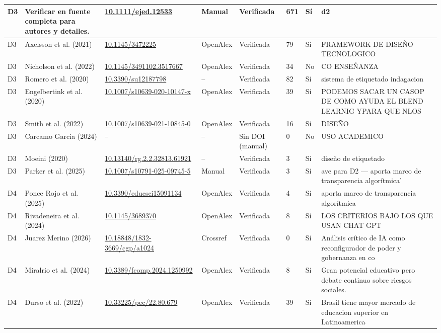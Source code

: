 {\begin{longtable}{|p{0.55cm}|p{2.6cm}|p{2.8cm}|p{1.3cm}|p{1.6cm}|p{0.8cm}|p{0.45cm}|p{2.4cm}|}
\hline
D3 & Verificar en fuente completa para autores y detalles. & {\scriptsize \url{10.1111/ejed.12533}} & Manual & Verificada & 671 & Sí & d2 \\
\hline
D3 & Axelsson et al. (2021) & {\scriptsize \url{10.1145/3472225}} & OpenAlex & Verificada & 79 & Sí & FRAMEWORK DE DISEÑO TECNOLOGICO \\
\hline
D3 & Nicholson et al. (2022) & {\scriptsize \url{10.1145/3491102.3517667}} & OpenAlex & Verificada & 34 & No & CO ENSEÑANZA \\
\hline
D3 & Romero et al. (2020) & {\scriptsize \url{10.3390/su12187798}} & -- & Verificada & 82 & Sí & sistema de etiquetado indagacion \\
\hline
D3 & Engelbertink et al. (2020) & {\scriptsize \url{10.1007/s10639-020-10147-x}} & OpenAlex & Verificada & 39 & Sí & PODEMOS SACAR UN CASOP DE COMO AYUDA  EL BLEND LEARNIG YPARA QUE NLOS  \\
\hline
D3 & Smith et al. (2022) & {\scriptsize \url{10.1007/s10639-021-10845-0}} & OpenAlex & Verificada & 16 & Sí & DISEÑO \\
\hline
D3 & Carcamo Garcia (2024) & {\scriptsize --} & -- & Sin DOI (manual) & 0 & No & USO ACADEMICO \\
\hline
D3 & Moeini (2020) & {\scriptsize \url{10.13140/rg.2.2.32813.61921}} & -- & Verificada & 3 & Sí & diseño de etiquetado \\
\hline
D3 & Parker et al. (2025) & {\scriptsize \url{10.1007/s10791-025-09745-5}} & Manual & Verificada & 3 & Sí & ave para D2 — aporta marco de transparencia algorítmica' \\
\hline
D4 & Ponce Rojo et al. (2025) & {\scriptsize \url{10.3390/educsci15091134}} & OpenAlex & Verificada & 4 & Sí & aporta marco de transparencia algorítmica \\
\hline
D4 & Rivadeneira et al. (2024) & {\scriptsize \url{10.1145/3689370}} & OpenAlex & Verificada & 8 & Sí & LOS CRITERIOS BAJO LOS QUE USAN CHAT GPT \\
\hline
D4 & Juarez Merino (2026) & {\scriptsize \url{10.18848/1832-3669/cgp/a1024}} & Crossref & Verificada & 0 & Sí & Análisis crítico de IA como reconfigurador de poder y gobernanza en co \\
\hline
D4 & Miralrio et al. (2024) & {\scriptsize \url{10.3389/fcomp.2024.1250992}} & OpenAlex & Verificada & 8 & Sí & Gran potencial educativo pero debate continuo sobre riesgos sociales. \\
\hline
D4 & Durso et al. (2022) & {\scriptsize \url{10.33225/pec/22.80.679}} & OpenAlex & Verificada & 39 & Sí & Brasil tiene mayor mercado de educacion superior en Latinoamerica \\

\end{longtable}}
